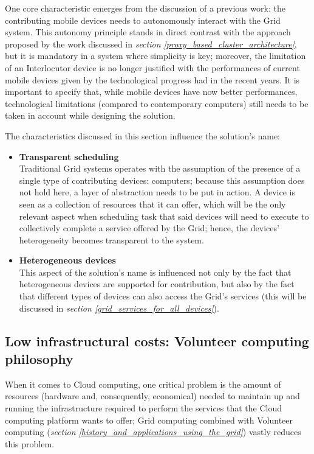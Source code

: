 One core characteristic emerges from the discussion of a previous work: the contributing mobile devices needs to autonomously interact with the Grid system.
This autonomy principle stands in direct contrast with the approach proposed by the work discussed in \textit{section \ref{proxy_based_cluster_architecture}}, but it is mandatory in a system where simplicity is key; moreover, the limitation of an Interlocutor device is no longer justified with the performances of current mobile devices given by the technological progress had in the recent years. It is important to specify that, while mobile devices have now better performances, technological limitations (compared to contemporary computers) still needs to be taken in account while designing the solution.

The characteristics discussed in this section influence the solution's name:
\begin{itemize}
    \item \textbf{Transparent scheduling}\\
    Traditional Grid systems operates with the assumption of the presence of a single type of contributing devices: computers; because this assumption does not hold here, a layer of abstraction needs to be put in action. A device is seen as a collection of resources that it can offer, which will be the only relevant aspect when scheduling task that said devices will need to execute to collectively complete a service offered by the Grid; hence, the devices' heterogeneity becomes transparent to the system.
    \item \textbf{Heterogeneous devices}\\
    This aspect of the solution's name is influenced not only by the fact that heterogeneous devices are supported for contribution, but also by the fact that different types of devices can also access the Grid's services (this will be discussed in \textit{section \ref{grid_services_for_all_devices}}).
\end{itemize}

\subsection{Low infrastructural costs: Volunteer computing philosophy}\label{low_infrastructural_costs_volunteer_computing_philosophy}
When it comes to Cloud computing, one critical problem is the amount of resources (hardware and, consequently, economical) needed to maintain up and running the infrastructure required to perform the services that the Cloud computing platform wants to offer; Grid computing combined with Volunteer computing (\textit{section \ref{history_and_applications_using_the_grid}}) vastly reduces this problem.


